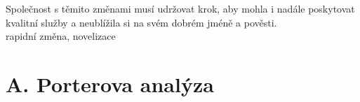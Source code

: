 Společnost s těmito změnami musí udržovat krok, aby mohla i nadále poskytovat kvalitní služby a neublížila si na svém dobrém jméně a pověsti.\\

rapidní změna, novelizace


\section*{A. Porterova analýza}
\label{sec:Porterova analyza}

